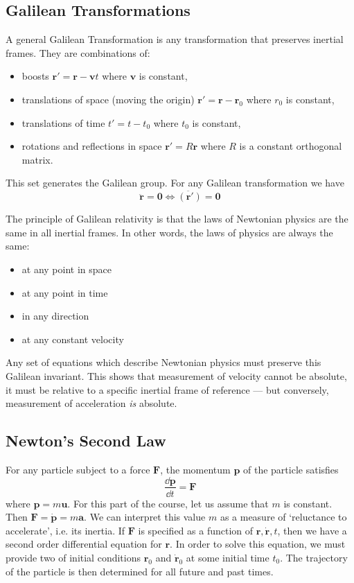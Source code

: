 \documentclass{article}
\begin{document}
\subsection{Galilean Transformations}
A general Galilean Transformation is any transformation that preserves inertial frames. They are combinations of:
\begin{itemize}
    \item boosts $\bm r' = \bm r - \bm vt$ where $\bm v$ is constant,
    \item translations of space (moving the origin) $\bm r' = \bm r - \bm r_0$ where $r_0$ is constant,
    \item translations of time $t' = t - t_0$ where $t_0$ is constant,
    \item rotations and reflections in space $\bm r' = R \bm r$ where $R$ is a constant orthogonal matrix.
\end{itemize}
This set generates the Galilean group. For any Galilean transformation we have
\[ \ddot{\bm r} = \bm 0 \iff \ddot{(\bm r')} = \bm 0 \]

The principle of Galilean relativity is that the laws of Newtonian physics are the same in all inertial frames. In other words, the laws of physics are always the same:
\begin{itemize}
    \item at any point in space
    \item at any point in time
    \item in any direction
    \item at any constant velocity
\end{itemize}
Any set of equations which describe Newtonian physics must preserve this Galilean invariant. This shows that measurement of velocity cannot be absolute, it must be relative to a specific inertial frame of reference --- but conversely, measurement of acceleration \textit{is} absolute.

\subsection{Newton's Second Law}
For any particle subject to a force $\bm F$, the momentum $\bm p$ of the particle satisfies
\[ \frac{\dd \bm p}{\dd t} = \bm F \]
where $\bm p = m \bm u$. For this part of the course, let us assume that $m$ is constant. Then $\bm F = \dot{\bm p} = m \bm a$. We can interpret this value $m$ as a measure of `reluctance to accelerate', i.e. its inertia. If $\bm F$ is specified as a function of $\bm r, \dot{\bm r}, t$, then we have a second order differential equation for $\bm r$. In order to solve this equation, we must provide two of initial conditions $\bm r_0$ and $\dot{\bm r}_0$ at some initial time $t_0$. The trajectory of the particle is then determined for all future and past times.
\end{document}
